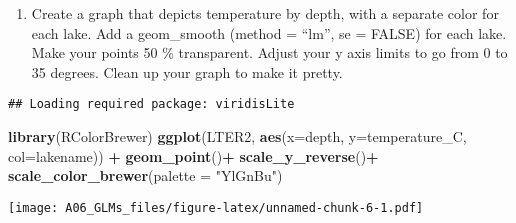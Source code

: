 \documentclass[]{article}
\newenvironment{Shaded}{\begin{snugshade}}{\end{snugshade}}
\newcommand{\KeywordTok}[1]{\textcolor[rgb]{0.13,0.29,0.53}{\textbf{#1}}}
\newcommand{\DataTypeTok}[1]{\textcolor[rgb]{0.13,0.29,0.53}{#1}}
\newcommand{\StringTok}[1]{\textcolor[rgb]{0.31,0.60,0.02}{#1}}
\newcommand{\CommentTok}[1]{\textcolor[rgb]{0.56,0.35,0.01}{\textit{#1}}}
\newcommand{\OperatorTok}[1]{\textcolor[rgb]{0.81,0.36,0.00}{\textbf{#1}}}
\newcommand{\NormalTok}[1]{#1}
\providecommand{\tightlist}{%
  \setlength{\itemsep}{0pt}\setlength{\parskip}{0pt}}
\begin{document}
\begin{enumerate}
\def\labelenumi{\arabic{enumi}.}
\setcounter{enumi}{15}
\tightlist
\item
  Create a graph that depicts temperature by depth, with a separate
  color for each lake. Add a geom\_smooth (method = ``lm'', se = FALSE)
  for each lake. Make your points 50 \% transparent. Adjust your y axis
  limits to go from 0 to 35 degrees. Clean up your graph to make it
  pretty.
\end{enumerate}

\begin{Shaded}
\end{Shaded}

\begin{verbatim}
## Loading required package: viridisLite
\end{verbatim}

\begin{Shaded}
\begin{Highlighting}[]
\KeywordTok{library}\NormalTok{(RColorBrewer)}
\KeywordTok{ggplot}\NormalTok{(LTER2, }\KeywordTok{aes}\NormalTok{(}\DataTypeTok{x=}\NormalTok{depth, }\DataTypeTok{y=}\NormalTok{temperature_C, }\DataTypeTok{col=}\NormalTok{lakename)) }\OperatorTok{+}
\StringTok{  }\KeywordTok{geom_point}\NormalTok{()}\OperatorTok{+}
\StringTok{  }\KeywordTok{scale_y_reverse}\NormalTok{()}\OperatorTok{+}
\StringTok{  }\KeywordTok{scale_color_brewer}\NormalTok{(}\DataTypeTok{palette =} \StringTok{"YlGnBu"}\NormalTok{)}
\end{Highlighting}
\end{Shaded}

\texttt{[image: A06\_GLMs\_files/figure-latex/unnamed-chunk-6-1.pdf]}
\end{document}

